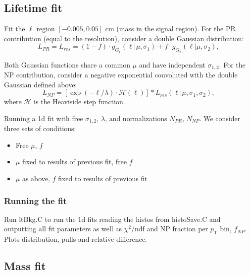 \documentclass{article}
\newcommand{\pt}{p_\text{T}}
\begin{document}
\subsection{Lifetime fit}

Fit the $\ell$ region $[-0.005,0.05]$ cm (mass in the signal region). For the PR contribution (equal to the resolution), consider a double Gaussian distribution:
\begin{equation}
L_{PR}=L_{res} = (1-f)\cdot g_{G_1}(\ell|\mu, \sigma_1)+f\cdot g_{G_2}(\ell|\mu, \sigma_2),
\end{equation}

Both Gaussian functions share a common $\mu$ and have independent $\sigma_{1,2}$. For the NP contribution, consider a negative exponential convoluted with the double Gaussian defined above:
\begin{equation}
L_{NP}=	\left[\exp(-\ell/\lambda)\cdot\mathcal{H}(\ell)\right]*L_{res}(\ell|\mu, \sigma_1,\sigma_2),
\end{equation}
where $\mathcal{H}$ is the Heaviside step function.

Running a 1d fit with free $\sigma_{1,2}$, $\lambda$, and normalizations $N_{PR}$, $N_{NP}$. We consider three sets of conditions:
\begin{itemize}
\item Free $\mu$, $f$
\item $\mu$ fixed to results of previous fit, free $f$
\item $\mu$ as above, $f$ fixed to results of previous fit
\end{itemize} 

\subsubsection{Running the fit}

Run ltBkg.C to run the 1d fits reading the histos from histoSave.C and outputting all fit parameters as well as $\chi^2/$ndf and NP fraction per $\pt$ bin, $f_{NP}$. Plots distribution, pulls and relative difference.

\pagebreak

\subsection{Mass fit}
\end{document}
